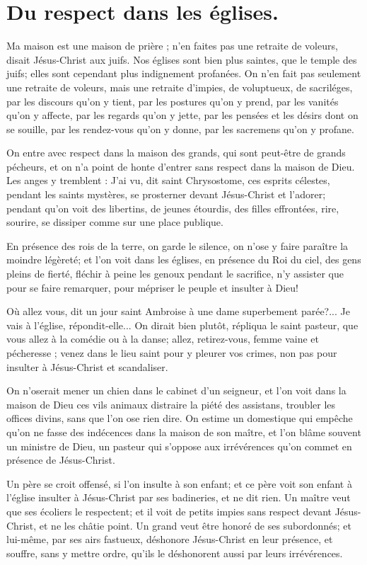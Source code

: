 \documentclass[instructions.tex]{subfiles}
\begin{document}
 
\chapter{Du respect dans les églises.}
 
\primo Ma maison est une maison de prière ; n’en faites pas une retraite de voleurs, disait Jésus-Christ aux juifs. Nos églises sont bien plus saintes, que le temple des juifs; elles sont cependant plus indignement profanées. On n’en fait pas seulement une retraite de voleurs, mais une retraite d’impies, de voluptueux, de sacriléges, par les discours qu’on y tient, par les postures qu’on y prend, par les vanités qu’on y affecte, par les regards qu’on y jette, par les pensées et les désirs dont on se souille, par les rendez-vous qu’on y donne, par les sacremens qu’on y profane.
 
On entre avec respect dans la maison des grands, qui sont peut-être de grands pécheurs, et on n’a point de honte d’entrer sans respect dans la maison de Dieu. Les anges y tremblent : J’ai vu, dit saint Chrysostome, ces esprits célestes, pendant les saints mystères, se prosterner devant Jésus-Christ et l’adorer; pendant qu’on voit des libertins, de jeunes étourdis, des filles effrontées, rire, sourire, se dissiper comme sur une place publique.
 
En présence des rois de la terre, on garde le silence, on n’ose y faire paraître la moindre légèreté; et l’on voit dans les églises, en présence du Roi du ciel, des gens pleins de fierté, fléchir à peine les genoux pendant le sacrifice, n’y assister que pour se faire remarquer, pour mépriser le peuple et insulter à Dieu!
 
Où allez vous, dit un jour saint Ambroise à une dame superbement parée?... Je vais à l’église, répondit-elle... On dirait bien plutôt, répliqua le saint pasteur, que vous allez à la comédie ou à la danse; allez, retirez-vous, femme vaine et pécheresse ; venez dans le lieu saint pour y pleurer vos crimes, non pas pour insulter à Jésus-Christ et scandaliser.
 
On n’oserait mener un chien dans le cabinet d’un seigneur, et l’on voit dans la maison de Dieu ces vils animaux distraire la piété des assistans, troubler les offices divins, sans que l’on ose rien dire. On estime un domestique qui empêche qu’on ne fasse des indécences dans la maison de son maître, et l’on blâme souvent un ministre de Dieu, un pasteur qui s’oppose aux irrévérences qu’on commet en présence de Jésus-Christ.
 
Un père se croit offensé, si l’on insulte à son enfant; et ce père voit son enfant à l’église insulter à Jésus-Christ par ses badineries, et ne dit rien. Un maître veut que ses écoliers le respectent; et il voit de petits impies sans respect devant Jésus-Christ, et ne les châtie point. Un grand veut être honoré de ses subordonnés; et lui-même, par ses airs fastueux, déshonore Jésus-Christ en leur présence, et souffre, sans y mettre ordre, qu’ils le déshonorent aussi par leurs irrévérences.
 
\end{document}

